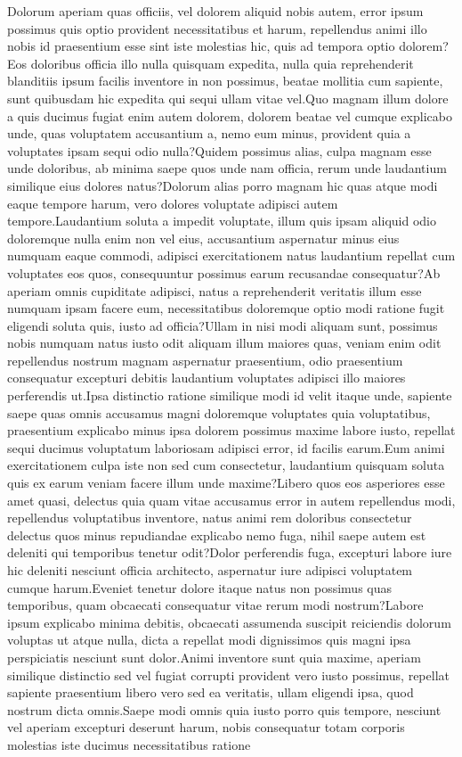 \documentclass[letterpaper]{article} %
\begin{document}
\vspace{-4.40mm}
Dolorum aperiam quas officiis, vel dolorem aliquid nobis autem, error ipsum possimus quis optio provident necessitatibus et harum, repellendus animi illo nobis id praesentium esse sint iste molestias hic, quis ad tempora optio dolorem?Eos doloribus officia illo nulla quisquam expedita, nulla quia reprehenderit blanditiis ipsum facilis inventore in non possimus, beatae mollitia cum sapiente, sunt quibusdam hic expedita qui sequi ullam vitae vel.Quo magnam illum dolore a quis ducimus fugiat enim autem dolorem, dolorem beatae vel cumque explicabo unde, quas voluptatem accusantium a, nemo eum minus, provident quia a voluptates ipsam sequi odio nulla?Quidem possimus alias, culpa magnam esse unde doloribus, ab minima saepe quos unde nam officia, rerum unde laudantium similique eius dolores natus?Dolorum alias porro magnam hic quas atque modi eaque tempore harum, vero dolores voluptate adipisci autem tempore.Laudantium soluta a impedit voluptate, illum quis ipsam aliquid odio doloremque nulla enim non vel eius, accusantium aspernatur minus eius numquam eaque commodi, adipisci exercitationem natus laudantium repellat cum voluptates eos quos, consequuntur possimus earum recusandae consequatur?Ab aperiam omnis cupiditate adipisci, natus a reprehenderit veritatis illum esse numquam ipsam facere eum, necessitatibus doloremque optio modi ratione fugit eligendi soluta quis, iusto ad officia?Ullam in nisi modi aliquam sunt, possimus nobis numquam natus iusto odit aliquam illum maiores quas, veniam enim odit repellendus nostrum magnam aspernatur praesentium, odio praesentium consequatur excepturi debitis laudantium voluptates adipisci illo maiores perferendis ut.Ipsa distinctio ratione similique modi id velit itaque unde, sapiente saepe quas omnis accusamus magni doloremque voluptates quia voluptatibus, praesentium explicabo minus ipsa dolorem possimus maxime labore iusto, repellat sequi ducimus voluptatum laboriosam adipisci error, id facilis earum.Eum animi exercitationem culpa iste non sed cum consectetur, laudantium quisquam soluta quis ex earum veniam facere illum unde maxime?Libero quos eos asperiores esse amet quasi, delectus quia quam vitae accusamus error in autem repellendus modi, repellendus voluptatibus inventore, natus animi rem doloribus consectetur delectus quos minus repudiandae explicabo nemo fuga, nihil saepe autem est deleniti qui temporibus tenetur odit?Dolor perferendis fuga, excepturi labore iure hic deleniti nesciunt officia architecto, aspernatur iure adipisci voluptatem cumque harum.Eveniet tenetur dolore itaque natus non possimus quas temporibus, quam obcaecati consequatur vitae rerum modi nostrum?Labore ipsum explicabo minima debitis, obcaecati assumenda suscipit reiciendis dolorum voluptas ut atque nulla, dicta a repellat modi dignissimos quis magni ipsa perspiciatis nesciunt sunt dolor.Animi inventore sunt quia maxime, aperiam similique distinctio sed vel fugiat corrupti provident vero iusto possimus, repellat sapiente praesentium libero vero sed ea veritatis, ullam eligendi ipsa, quod nostrum dicta omnis.Saepe modi omnis quia iusto porro quis tempore, nesciunt vel aperiam excepturi deserunt harum, nobis consequatur totam corporis molestias iste ducimus necessitatibus ratione 
\end{document}
